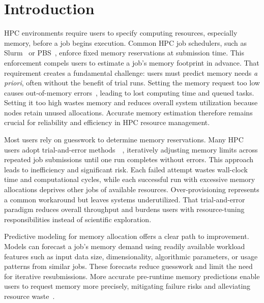 \section{Introduction}
\label{sec:pmc-introduction}

\ac{HPC} environments require users to specify computing resources, especially memory, before a job begins execution.
Common \ac{HPC} job schedulers, such as Slurm~\cite{yoo2003slurm} or \ac{PBS}~\cite{henderson1995pbs}, enforce fixed memory reservations at submission time.
This enforcement compels users to estimate a job's memory footprint in advance.
That requirement creates a fundamental challenge: users must predict memory needs \emph{a priori}, often without the benefit of trial runs.
Setting the memory request too low causes out-of-memory errors~\cite{bailey2005,hovestadt2003}, leading to lost computing time and queued tasks.
Setting it too high wastes memory and reduces overall system utilization because nodes retain unused allocations.
Accurate memory estimation therefore remains crucial for reliability and efficiency in \ac{HPC} resource management.

Most users rely on guesswork to determine memory reservations.
Many \ac{HPC} users adopt trial-and-error methods~~\cite{rodrigues2016,li2019,newaz2023,tanash2021ampro}, iteratively adjusting memory limits across repeated job submissions until one run completes without errors.
This approach leads to inefficiency and significant risk.
Each failed attempt wastes wall-clock time and computational cycles, while each successful run with excessive memory allocations deprives other jobs of available resources.
Over-provisioning represents a common workaround but leaves systems underutilized.
That trial-and-error paradigm reduces overall throughput and burdens users with resource-tuning responsibilities instead of scientific exploration.

Predictive modeling for memory allocation offers a clear path to improvement.
Models can forecast a job's memory demand using readily available workload features such as input data size, dimensionality, algorithmic parameters, or usage patterns from similar jobs.
These forecasts reduce guesswork and limit the need for iterative resubmissions.
More accurate pre-runtime memory predictions enable users to request memory more precisely, mitigating failure risks and alleviating resource waste~\cite{tanash2021ampro}.

